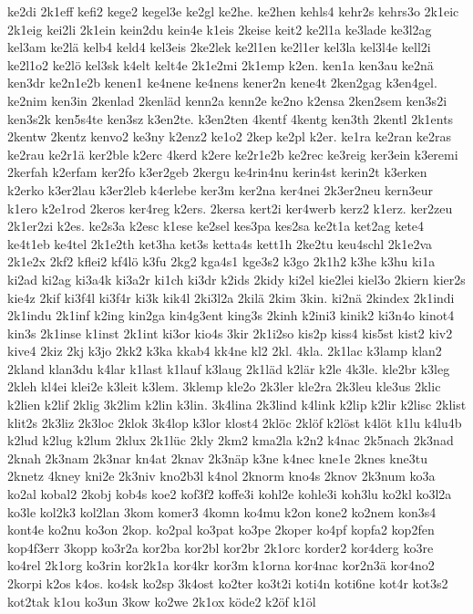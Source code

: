 {ke2di
2k1eff
kefi2
kege2
kegel3e
ke2gl
ke2he.
ke2hen
kehls4
kehr2s
kehrs3o
2k1eic
2k1eig
kei2li
2k1ein
kein2du
kein4e
k1eis
2keise
keit2
ke2l1a
ke3lade
ke3l2ag
kel3am
ke2lä
kelb4
keld4
kel3eis
2ke2lek
ke2l1en
ke2l1er
kel3la
kel3l4e
kell2i
ke2l1o2
ke2lö
kel3sk
k4elt
kelt4e
2k1e2mi
2k1emp
k2en.
ken1a
ken3au
ke2nä
ken3dr
ke2n1e2b
kenen1
ke4nene
ke4nens
kener2n
kene4t
2ken2gag
k3en4gel.
ke2nim
ken3in
2kenlad
2kenläd
kenn2a
kenn2e
ke2no
k2ensa
2ken2sem
ken3s2i
ken3s2k
ken5s4te
ken3sz
k3en2te.
k3en2ten
4kentf
4kentg
ken3th
2kentl
2k1ents
2kentw
2kentz
kenvo2
ke3ny
k2enz2
ke1o2
2kep
ke2pl
k2er.
ke1ra
ke2ran
ke2ras
ke2rau
ke2r1ä
ker2ble
k2erc
4kerd
k2ere
ke2r1e2b
ke2rec
ke3reig
ker3ein
k3eremi
2kerfah
k2erfam
ker2fo
k3er2geb
2kergu
ke4rin4nu
kerin4st
kerin2t
k3erken
k2erko
k3er2lau
k3er2leb
k4erlebe
ker3m
ker2na
ker4nei
2k3er2neu
kern3eur
k1ero
k2e1rod
2keros
ker4reg
k2ers.
2kersa
kert2i
ker4werb
kerz2
k1erz.
ker2zeu
2k1er2zi
k2es.
ke2s3a
k2esc
k1ese
ke2sel
kes3pa
kes2sa
ke2t1a
ket2ag
kete4
ke4t1eb
ke4tel
2k1e2th
ket3ha
ket3s
ketta4s
kett1h
2ke2tu
keu4schl
2k1e2va
2k1e2x
2kf2
kflei2
kf4lö
k3fu
2kg2
kga4s1
kge3s2
k3go
2k1h2
k3he
k3hu
ki1a
ki2ad
ki2ag
ki3a4k
ki3a2r
ki1ch
ki3dr
k2ids
2kidy
ki2el
kie2lei
kiel3o
2kiern
kier2s
kie4z
2kif
ki3f4l
ki3f4r
ki3k
kik4l
2ki3l2a
2kilä
2kim
3kin.
ki2nä
2kindex
2k1indi
2k1indu
2k1inf
k2ing
kin2ga
kin4g3ent
king3s
2kinh
k2ini3
kinik2
ki3n4o
kinot4
kin3s
2k1inse
k1inst
2k1int
ki3or
kio4s
3kir
2k1i2so
kis2p
kiss4
kis5st
kist2
kiv2
kive4
2kiz
2kj
k3jo
2kk2
k3ka
kkab4
kk4ne
kl2
2kl.
4kla.
2k1lac
k3lamp
klan2
2kland
klan3du
k4lar
k1last
k1lauf
k3laug
2k1läd
k2lär
k2le
4k3le.
kle2br
k3leg
2kleh
kl4ei
klei2e
k3leit
k3lem.
3klemp
kle2o
2k3ler
kle2ra
2k3leu
kle3us
2klic
k2lien
k2lif
2klig
3k2lim
k2lin
k3lin.
3k4lina
2k3lind
k4link
k2lip
k2lir
k2lisc
2klist
klit2s
2k3liz
2k3loc
2klok
3k4lop
k3lor
klost4
2klöc
2klöf
k2löst
k4löt
k1lu
k4lu4b
k2lud
k2lug
k2lum
2klux
2k1lüc
2kly
2km2
kma2la
k2n2
k4nac
2k5nach
2k3nad
2knah
2k3nam
2k3nar
kn4at
2knav
2k3näp
k3ne
k4nec
kne1e
2knes
kne3tu
2knetz
4kney
kni2e
2k3niv
kno2b3l
k4nol
2knorm
kno4s
2knov
2k3num
ko3a
ko2al
kobal2
2kobj
kob4s
koe2
kof3f2
koffe3i
kohl2e
kohle3i
koh3lu
ko2kl
ko3l2a
ko3le
kol2k3
kol2lan
3kom
komer3
4komn
ko4mu
k2on
kone2
ko2nem
kon3s4
kont4e
ko2nu
ko3on
2kop.
ko2pal
ko3pat
ko3pe
2koper
ko4pf
kopfa2
kop2fen
kop4f3err
3kopp
ko3r2a
kor2ba
kor2bl
kor2br
2k1orc
korder2
kor4derg
ko3re
ko4rel
2k1org
ko3rin
kor2k1a
kor4kr
kor3m
k1orna
kor4nac
kor2n3ä
kor4no2
2korpi
k2os
k4os.
ko4sk
ko2sp
3k4ost
ko2ter
ko3t2i
koti4n
koti6ne
kot4r
kot3s2
kot2tak
k1ou
ko3un
3kow
ko2we
2k1ox
köde2
k2öf
k1öl
}
